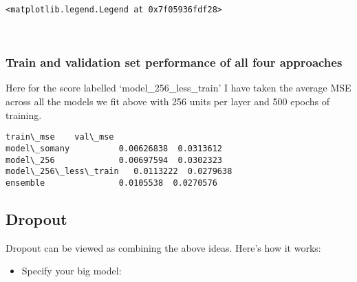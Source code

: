 \documentclass[11pt]{article}
\makeatletter
\providecommand{\tightlist}{%
      \setlength{\itemsep}{0pt}\setlength{\parskip}{0pt}}
\newcommand{\boxspacing}{\kern\kvtcb@left@rule\kern\kvtcb@boxsep}
\newcommand{\prompt}[4]{
        \ttfamily\llap{{\color{#2}[#3]:\hspace{3pt}#4}}\vspace{-\baselineskip}
    }
\makeatother
\begin{document}
            \begin{tcolorbox}[breakable, size=fbox, boxrule=.5pt, pad at break*=1mm, opacityfill=0]
\prompt{Out}{outcolor}{19}{\boxspacing}
\begin{Verbatim}[commandchars=\\\{\}]
<matplotlib.legend.Legend at 0x7f05936fdf28>
\end{Verbatim}
\end{tcolorbox}
        
    \begin{center}
    \end{center}
    { \hspace*{\fill} \\}
    
    \hypertarget{train-and-validation-set-performance-of-all-four-approaches}{%
\subsubsection{Train and validation set performance of all four
approaches}\label{train-and-validation-set-performance-of-all-four-approaches}}

Here for the score labelled `model\_256\_less\_train' I have taken the
average MSE across all the models we fit above with 256 units per layer
and 500 epochs of training.

            \begin{tcolorbox}[breakable, size=fbox, boxrule=.5pt, pad at break*=1mm, opacityfill=0]
\prompt{Out}{outcolor}{20}{\boxspacing}
\begin{Verbatim}[commandchars=\\\{\}]
                       train\_mse    val\_mse
model\_somany          0.00626838  0.0313612
model\_256             0.00697594  0.0302323
model\_256\_less\_train   0.0113222  0.0279638
ensemble               0.0105538  0.0270576
\end{Verbatim}
\end{tcolorbox}
        
\newpage

    \hypertarget{dropout}{%
\subsection{Dropout}\label{dropout}}

Dropout can be viewed as combining the above ideas. Here's how it works:

\begin{itemize}
\tightlist
\item
  Specify your big model:
\end{itemize}
\end{document}
